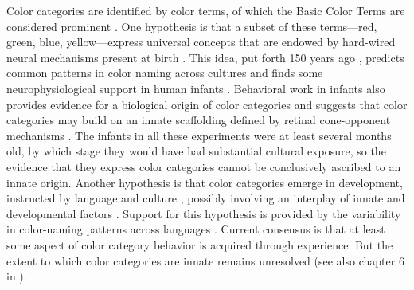 \documentclass[9pt,biorxiv,lineno,onehalfspacing]{lapreprint}
\begin{document}
\begin{refsection}
Color categories are identified by color terms, of which the Basic Color Terms are considered prominent \citep{berlin_basic_1969}.
One hypothesis is that a subset of these terms---red, green, blue, yellow---express universal concepts \citep{heider_universals_1972,regier_focal_2005}
that are endowed by hard-wired neural mechanisms present at birth \citep{bornstein_categories_1976,lindsey_universality_2006}. 
This idea, put forth 150 years ago \citep{hering_zur_1875}, predicts common patterns in color naming across cultures \citep{baronchelli_modeling_2010,lindsey_hunter-gatherer_2015,abbott_focal_2016}
and finds some neurophysiological support in human infants \citep{clifford_electrophysiological_2009,yang_cortical_2016}. 
Behavioral work in infants also provides evidence for a biological origin of color categories \citep{franklin_new_2004,ozturk_language_2013} and suggests that color categories may build on an innate scaffolding defined by retinal cone-opponent mechanisms \citep{skelton_biological_2017}. The infants in all these experiments were at least several months old, by which stage they would have had substantial cultural exposure, so the evidence that they express color categories cannot be conclusively ascribed to an innate origin. Another hypothesis is that color categories emerge in development, instructed by language and culture \citep{davidoff_colour_1999,roberson_color_2005}, possibly involving an interplay of innate and developmental factors \citep{webster_variations_2002,kay_language_2006,franklin_lateralization_2008,regier_language_2009,paramei_online_2018}. Support for this hypothesis is provided by the variability in color-naming patterns across languages \citep{davidoff_colour_1999,webster_variations_2002,roberson_color_2005,kay_language_2006,gibson_color_2017, paramei_online_2018}. Current consensus is that at least some aspect of color category behavior is acquired through experience. But the extent to which color categories are innate remains unresolved \citep{davidoff_nature_2009,RN18696,RN18699}(see also chapter 6 in \citep{block_border_2023}).


\end{refsection}
\end{document}
